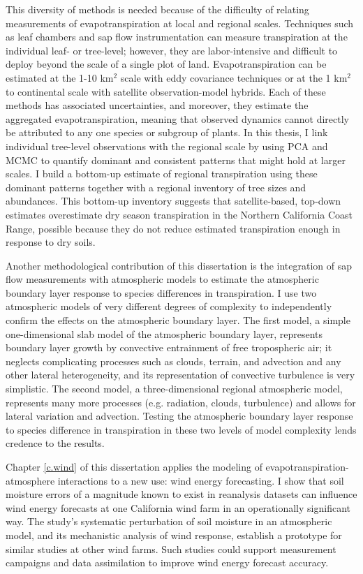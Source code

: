 This diversity of methods is needed because of the difficulty of relating measurements of evapotranspiration at local and regional scales.  Techniques such as leaf chambers and sap flow instrumentation can measure transpiration at the individual leaf- or tree-level; however, they are labor-intensive and difficult to deploy beyond the scale of a single plot of land.  Evapotranspiration can be estimated at the 1-10 km$^2$ scale with eddy covariance techniques or at the 1 km$^2$ to continental scale with satellite observation-model hybrids.  Each of these methods has associated uncertainties, and moreover, they estimate the aggregated evapotranspiration, meaning that observed dynamics cannot directly be attributed to any one species or subgroup of plants.  In this thesis, I link individual tree-level observations with the regional  scale by using PCA and MCMC to quantify dominant and consistent patterns that might hold at larger scales.  I build a bottom-up estimate of regional transpiration using these dominant patterns together with a regional inventory of tree sizes and abundances.  This bottom-up inventory suggests that satellite-based, top-down estimates overestimate dry season transpiration in the Northern California Coast Range, possible because they do not reduce estimated transpiration enough in response to dry soils.

Another methodological contribution of this dissertation is the integration of sap flow measurements with atmospheric models to estimate the atmospheric boundary layer response to species differences in transpiration.  I use two atmospheric models of very different degrees of complexity to independently confirm the effects on the atmospheric boundary layer.  The first model, a simple one-dimensional slab model of the atmospheric boundary layer, represents boundary layer growth by convective entrainment of free tropospheric air; it neglects complicating processes such as clouds, terrain, and advection and any other lateral heterogeneity, and its representation of convective turbulence is very simplistic.  The second model, a three-dimensional regional atmospheric model, represents many more processes (e.g. radiation, clouds, turbulence) and allows for lateral variation and advection.  Testing the atmospheric boundary layer response to species difference in transpiration in these two levels of model complexity lends credence to the results.

Chapter \ref{c.wind} of this dissertation applies the modeling of evapotranspiration-atmosphere interactions to a new use: wind energy forecasting.  I show that soil moisture errors of a magnitude known to exist in reanalysis datasets can influence wind energy forecasts at one California wind farm in an operationally significant way.  The study's systematic perturbation of soil moisture in an atmospheric model, and its mechanistic analysis of wind response, establish a prototype for similar studies at other wind farms.  Such studies could support measurement campaigns and data assimilation to improve wind energy forecast accuracy.

